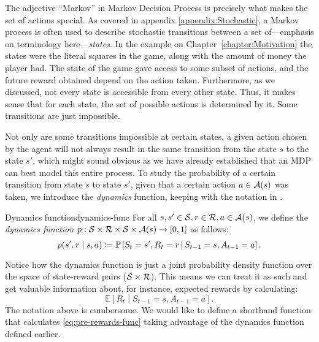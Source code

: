
The adjective ``Markov'' in Markov Decision Process is precisely what makes the
set of actions special. As covered in appendix \ref{appendix:Stochastic}, a Markov
process is often used to describe stochastic transitions between a set
of---emphasis on terminology here---\textit{states}. In the example on
Chapter~\ref{chapter:Motivation} the states were the literal squares in the
game, along with the amount of money the player had. The state of the game gave
access to some subset of actions, and the future reward obtained depend on the
action taken. Furthermore, as we discussed, not every state is accessible from
every other state.  Thus, it makes sense that for each state, the set of possible
actions is determined by it. Some transitions are just impossible.

Not only are some transitions impossible at certain states, a given action
chosen by the agent will not always result in the same transition from the state
$s$ to the state $s'$, which might sound obvious as we have already established
that an MDP can best model this entire process. To study the probability
of a certain transition from state $s$ to state $s'$, given that a certain action
$a \in \mathcal{A}(s)$ was taken, we introduce the \textit{dynamics} function,
keeping with the notation in \cite{SuttonBarto}.

\begin{dfn}{Dynamics function}{dynamics-func}
	For all $s, s' \in \mathcal{S}, r \in \mathcal{R}, a \in 
	\mathcal{A}(s)$, we define the \emph{dynamics function} $p: 
	\mathcal{S} \times \mathcal{R} \times \mathcal{S} \times \mathcal{A}(s) 
	\to [0, 1]$ as follows:
	\[
		p(s', r \mid s, a) \coloneqq \mathbb{P}\left[S_t = s', R_t = r 
		\,\middle\vert\, S_{t-1} = s, A_{t-1} = a\right].
	\]
\end{dfn}

Notice how the dynamics function is just a joint probability density function
over the space of state-reward pairs ($\mathcal{S} \times \mathcal{R}$). This means we
can treat it as such and get valuable information about, for instance, expected
rewards by calculating:
\begin{equation}
	\label{eq:pre-rewards-func}
	\mathbb{E} \left[ R_t \mid S_{t-1} = s, A_{t-1} = a \right].
\end{equation}
The notation above is cumbersome. We would like to define a shorthand function
that calculates \eqref{eq:pre-rewards-func} taking advantage of the dynamics
function defined earlier.

